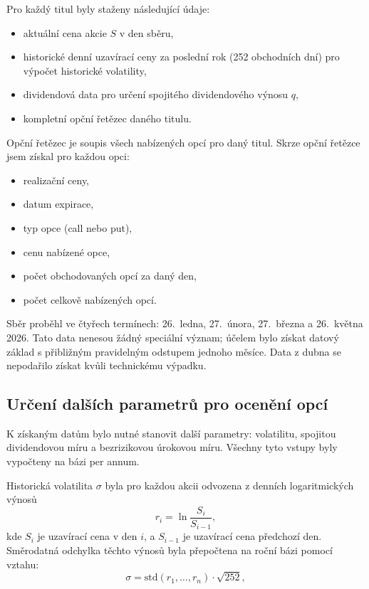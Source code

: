 \documentclass[male,czech,api_bc]{kitheses}
\begin{document}
  Pro každý titul byly staženy následující údaje:
  \begin{itemize}
    \item aktuální cena akcie \(S\) v den sběru,
    \item historické denní uzavírací ceny za poslední rok (252 obchodních dní) pro výpočet historické volatility,
    \item dividendová data pro určení spojitého dividendového výnosu \(q\),
    \item kompletní opční řetězec daného titulu.
  \end{itemize}
  Opční řetězec je soupis všech nabízených opcí pro daný titul. Skrze opční řetězce jsem získal pro každou opci:

  \begin{itemize}
    \item realizační ceny,
    \item datum expirace,
    \item typ opce (call nebo put),
    \item cenu nabízené opce,
    \item počet obchodovaných opcí za daný den,
    \item počet celkově nabízených opcí.
  \end{itemize}

  Sběr proběhl ve čtyřech termínech: 26.~ledna, 27.~února, 27.~března a 26.~května 2026. Tato data nenesou žádný speciální význam; účelem bylo získat datový základ s přibližným pravidelným odstupem jednoho měsíce. Data z dubna se nepodařilo získat kvůli technickému výpadku.



  \subsection{Určení dalších parametrů pro ocenění opcí}

  K získaným datům bylo nutné stanovit další parametry: volatilitu, spojitou dividendovou míru a bezrizikovou úrokovou míru. Všechny tyto vstupy byly vypočteny na bázi per annum.

  Historická volatilita \(\sigma\) byla pro každou akcii odvozena z denních logaritmických výnosů
  \[
    r_i = \ln\frac{S_i}{S_{i-1}},
  \]
  kde \(S_i\) je uzavírací cena v den \(i\), a $S_{i-1}$ je uzavírací cena předchozí den. Směrodatná odchylka těchto výnosů byla přepočtena na roční bázi pomocí vztahu:
  \[
    \sigma = \text{std}(r_1,\dots,r_n) \cdot \sqrt{252},
  \]
\end{document}

